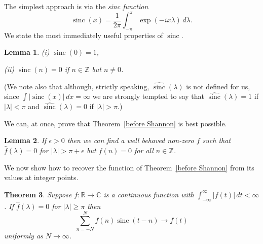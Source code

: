 \documentclass[12pt]{article}
\newtheorem{theorem}{Theorem}[section]
\newtheorem{lemma}[theorem]{Lemma}
\theoremstyle{definition}
\newcommand{\sinc}{\operatorname{sinc}}
\begin{document}
The simplest approach is via the \emph{sinc function}
\[\sinc(x)=\frac{1}{2\pi}\int_{-\pi}^{\pi}\exp(-ix\lambda)\,d\lambda.\]
We state the most immediately useful properties
of  $\sinc$.
\begin{lemma}
(i) $\sinc(0)=1$,

(ii) $\sinc(n)=0$ if $n\in{\mathbb Z}$ but $n\neq 0$.
\end{lemma}

(We note also that although, strictly speaking,
$\widehat{\sinc}(\lambda)$ is not defined
for us, since $\int|\sinc (x)|\,dx=\infty$
we are strongly tempted to say that
$\widehat{\sinc}(\lambda)=1$ if $|\lambda|<\pi$
and
$\widehat{\sinc}(\lambda)=0$ if $|\lambda|>\pi$.)

We can, at once, prove that Theorem~\ref{before Shannon}
is best possible.
\begin{lemma}\label{Shannon best}
If $\epsilon>0$ then we can find a
well behaved non-zero $f$ such that
$\hat{f}(\lambda)=0$ for $|\lambda|>\pi+\epsilon$
but $f(n)=0$ for all $n\in{\mathbb Z}$.
\end{lemma}

We now show how to recover the function of
Theorem~\ref{before Shannon} from its values
at integer points.
\begin{theorem}\label{Shannon constructive}
Suppose $f:{\mathbb R}\rightarrow{\mathbb C}$
is a continuous function with
$\int_{-\infty}^{\infty}|f(t)|\,dt<\infty$.
If $\hat{f}(\lambda)=0$
for $|\lambda|\geq\pi$
then
\[\sum_{n=-N}^{N}f(n)\sinc(t-n)\rightarrow f(t)\]
uniformly as $N\rightarrow\infty$.
\end{theorem}
\end{document}
